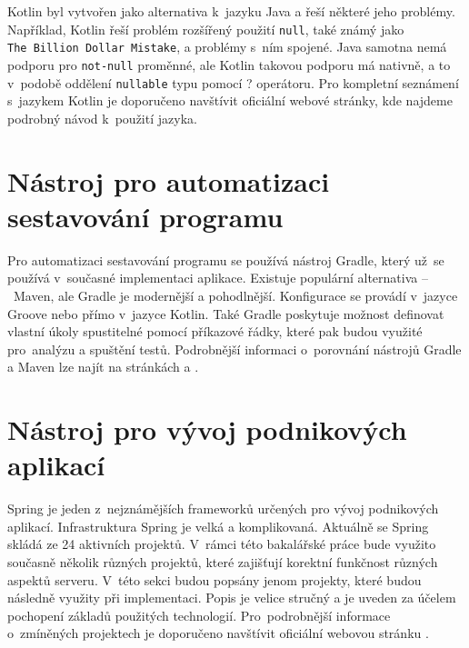     
    Kotlin byl vytvořen jako alternativa k~jazyku Java a řeší některé jeho problémy. Například, Kotlin řeší problém rozšířený použití \texttt{null}, také známý jako \texttt{The~Billion~Dollar~Mistake}, a problémy s~ním spojené. Java samotna nemá podporu pro \texttt{not-null} proměnné, ale Kotlin takovou podporu má nativně, a to v~podobě oddělení \texttt{nullable} typu pomocí ? operátoru. Pro kompletní seznámení s~jazykem Kotlin je doporučeno navštívit oficiální webové stránky, kde najdeme podrobný návod k~použití jazyka.\cite{kotlin-documentation}
    

\section{Nástroj pro automatizaci sestavování programu}\label{resere:build}
    Pro automatizaci sestavování programu se používá nástroj Gradle, který už~se používá v~současné implementaci aplikace. Existuje populární alternativa --~Maven, ale Gradle je modernější a pohodlnější. Konfigurace se provádí v~jazyce Groove nebo přímo v~jazyce Kotlin. Také Gradle poskytuje možnost definovat vlastní úkoly spustitelné pomocí příkazové řádky, které pak budou využité pro~analýzu a spuštění testů. Podrobnější informaci o~porovnání nástrojů Gradle a Maven lze najít na stránkách \cite{grale-vs-mavem} a \cite{gradle-vs-maven-bealdung}.

\section{Nástroj pro vývoj podnikových aplikací}\label{resere:j2ee}
    Spring je jeden z~nejznámějších frameworků určených pro vývoj podnikových aplikací. Infrastruktura Spring je velká a komplikovaná. Aktuálně se Spring skládá ze 24 aktivních projektů. V~rámci této bakalářské práce bude využito současně několik různých projektů, které zajišťují korektní funkčnost různých aspektů serveru. V~této sekci budou popsány jenom projekty, které budou následně využity při implementaci. Popis je velice stručný a je uveden za účelem pochopení základů použitých technologií. Pro~podrobnější informace o~zmíněných projektech je doporučeno navštívit oficiální webovou stránku \cite{spring-projects}.
    
